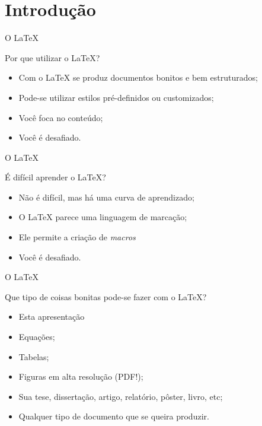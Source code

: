 \documentclass[10pt]{beamer}
\begin{document}
\section{Introdução}

\begin{frame}{O \LaTeX{}}
	\begin{block}{Por que utilizar o \LaTeX{}?}
		\begin{itemize}
			\pause
			\item Com o \LaTeX{} se produz documentos bonitos e bem estruturados;
			\pause
			\item Pode-se utilizar estilos pré-definidos ou customizados;
			\pause
			\item Você foca no conteúdo;
			\pause
			\item Você é desafiado.
		\end{itemize}
	\end{block}
\end{frame}

\begin{frame}{O \LaTeX{}}
	\begin{block}{É difícil aprender o \LaTeX{}?}
		\begin{itemize}
			\item {} Não é difícil, mas há uma curva de aprendizado;
			\item {} O \LaTeX{} parece uma linguagem de marcação;
			\item {} Ele permite a criação de \textit{macros}\footnotemark[1]
			\item {} Você é desafiado.
			\only<4->
		\end{itemize}
	\end{block}
\end{frame}

\begin{frame}{O \LaTeX{}}
	\begin{block}{Que tipo de coisas bonitas pode-se fazer com o \LaTeX{}?}
		\begin{itemize}
			\item {} Esta apresentação {\Large\Cooley}\footnotemark[1]
			\item {} Equações;
			\item {} Tabelas;
			\item {} Figuras em alta resolução (PDF!);
			\item {} Sua tese, dissertação, artigo, relatório, pôster, livro, etc;
			\item {} Qualquer tipo de documento que se queira produzir.
			\only<2->
		\end{itemize}
	\end{block}
\end{frame}
\end{document}

